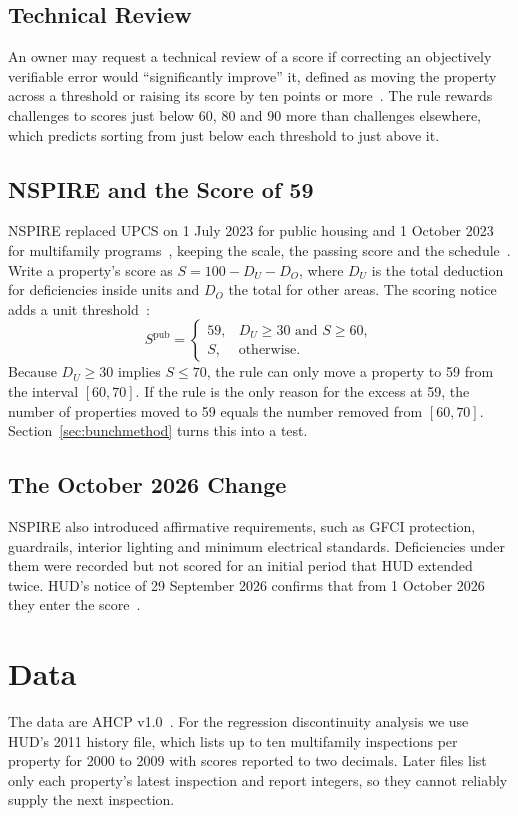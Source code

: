 \documentclass[10pt,twocolumn,letterpaper]{article}
\begin{document}
\subsection{Technical Review}
An owner may request a technical review of a score if correcting an objectively verifiable error would ``significantly improve'' it, defined as moving the property across a threshold or raising its score by ten points or more~\cite{fr2000}. The rule rewards challenges to scores just below 60, 80 and 90 more than challenges elsewhere, which predicts sorting from just below each threshold to just above it.

\subsection{NSPIRE and the Score of 59}
NSPIRE replaced UPCS on 1 July 2023 for public housing and 1 October 2023 for multifamily programs~\cite{nspirerule}, keeping the scale, the passing score and the schedule~\cite{cfr5705}. Write a property's score as $S=100-D_U-D_O$, where $D_U$ is the total deduction for deficiencies inside units and $D_O$ the total for other areas. The scoring notice adds a unit threshold~\cite{nspirescoring}:
\begin{equation}
S^{\text{pub}}=\begin{cases}59, & D_U\ge30\text{ and }S\ge60,\\ S, & \text{otherwise}.\end{cases}
\end{equation}
Because $D_U\ge30$ implies $S\le70$, the rule can only move a property to 59 from the interval $[60,70]$. If the rule is the only reason for the excess at 59, the number of properties moved to 59 equals the number removed from $[60,70]$. Section~\ref{sec:bunchmethod} turns this into a test.

\subsection{The October 2026 Change}
NSPIRE also introduced affirmative requirements, such as GFCI protection, guardrails, interior lighting and minimum electrical standards. Deficiencies under them were recorded but not scored for an initial period that HUD extended twice. HUD's notice of 29 September 2026 confirms that from 1 October 2026 they enter the score~\cite{fr2026}.

\section{Data}\label{sec:data}
The data are AHCP v1.0~\cite{ahcp}. For the regression discontinuity analysis we use HUD's 2011 history file, which lists up to ten multifamily inspections per property for 2000 to 2009 with scores reported to two decimals. Later files list only each property's latest inspection and report integers, so they cannot reliably supply the next inspection.
\end{document}

